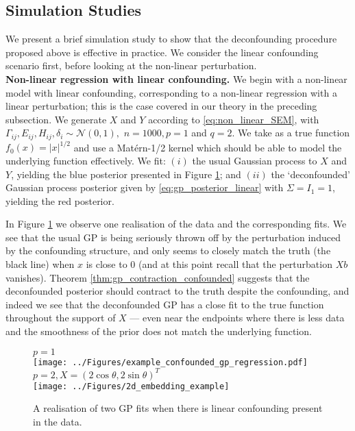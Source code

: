 \documentclass[11pt]{article}
\newcommand{\subparspace}{\vspace{3mm} \\}
\numberwithin{equation}{section}
\begin{document}
\subsection{Simulation Studies}
We present a brief simulation study to show that the deconfounding procedure proposed above is effective in practice. We consider the linear confounding scenario first, before looking at the non-linear perturbation.
\subparspace
{\bf Non-linear regression with linear confounding. } We begin with a non-linear model with linear confounding, corresponding to a non-linear regression with a linear perturbation; this is the case covered in our theory in the preceding subsection. We generate $X$ and $Y$ according to \eqref{eq:non_linear_SEM}, with $\Gamma_{ij}, E_{ij}, H_{ij}, \delta_{i} \sim \mathcal{N}(0, 1),$ $n = 1000, p = 1$ and $q = 2$. We take as a true function $f_0(x) = |x|^{1/2}$ and use a Mat\'ern-1/2 kernel which should be able to model the underlying function effectively. We fit: $(i)$ the usual Gaussian process to $X$ and $Y$, yielding the blue posterior presented in Figure \ref{fig:gp_lin_confounding}; and $(ii)$ the `deconfounded' Gaussian process posterior given by \eqref{eq:gp_posterior_linear} with $\Sigma = I_1 = 1$, yielding the red posterior.

In Figure \ref{fig:gp_lin_confounding} we observe one realisation of the data and the corresponding fits. We see that the usual GP is being seriously thrown off by the perturbation induced by the confounding structure, and only seems to closely match the truth (the black line) when $x$ is close to 0 (and at this point recall that the perturbation $Xb$ vanishes). Theorem \ref{thm:gp_contraction_confounded} suggests that the deconfounded posterior should contract to the truth despite the confounding, and indeed we see that the deconfounded GP has a close fit to the true function throughout the support of $X$ --- even near the endpoints where there is less data and the smoothness of the prior does not match the underlying function.
\begin{figure}[!h]
\centering
{\bf $p = 1$}\\
  \texttt{[image: ../Figures/example\_confounded\_gp\_regression.pdf]}\\
  {\bf $p = 2, X = (2\cos \theta, 2\sin \theta)^T$}\\
   \texttt{[image: ../Figures/2d\_embedding\_example]}
  \caption{A realisation of two GP fits when there is linear confounding present in the data.}
\label{fig:gp_lin_confounding}
\end{figure}
\end{document}
